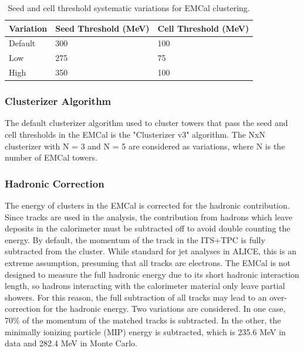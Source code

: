 \begin{table}[hbt!]
    \centering
    \caption{Seed and cell threshold systematic variations for EMCal clustering.}
    \begin{tabular}{ | m{1.7cm} | m{4.1cm}| m{4.1cm} | } 
      \hline
      Variation & Seed Threshold (MeV) & Cell Threshold (MeV) \\
      \hline
      Default & 300 & 100 \\ 
      \hline
      Low & 275 & 75 \\ 
      \hline
      High & 350 & 100 \\ 
      \hline
    \end{tabular}
    \label{tab:SeedCellThresholds}
\end{table}

\subsubsection{Clusterizer Algorithm}

The default clusterizer algorithm used to cluster towers that pass the seed and cell thresholds in the EMCal is the "Clusterizer v3" algorithm. The NxN clusterizer with N = 3 and N = 5 are considered as variations, where N is the number of EMCal towers.

\subsubsection{Hadronic Correction}

The energy of clusters in the EMCal is corrected for the hadronic contribution. Since tracks are used in the analysis, the contribution from hadrons which leave deposits in the calorimeter must be subtracted off to avoid double counting the energy. By default, the momentum of the track in the ITS+TPC is fully subtracted from the cluster. While standard for jet analyses in ALICE, this is an extreme assumption, presuming that all tracks are electrons. The EMCal is not designed to measure the full hadronic energy due to its short hadronic interaction length, so hadrons interacting with the calorimeter material only leave partial showers. For this reason, the full subtraction of all tracks may lead to an over-correction for the hadronic energy. Two variations are considered. In one case, 70\% of the momentum of the matched tracks is subtracted. In the other, the minimally ionizing particle (MIP) energy is subtracted, which is 235.6 MeV in data and 282.4 MeV in Monte Carlo.

